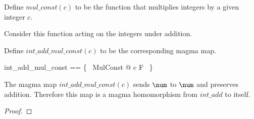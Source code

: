 \documentclass{amsart}
\begin{document}
\begin{example}

Define $mul\_const(c)$ to be the function that multiplies integers by a given integer $c$.


Consider this function acting on the integers under addition.


Define $int\_add\_mul\_const(c)$ to be the corresponding magma map.

\begin{zed}
	int\_add\_mul\_const == \{~ MulConst @ c \mapsto F ~\}
\end{zed}

The magma map $int\_add\_mul\_const(c)$ sends $\num$ to $\num$ and preserves addition.
Therefore this map is a magma homomorphism from $int\_add$ to itself.


\begin{proof}
\end{proof}

\end{example}
\end{document}

